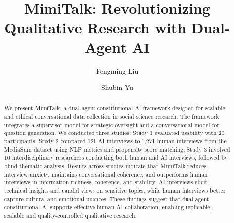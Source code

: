 \documentclass[sigchi,nonacm,manuscript]{acmart}
\begin{document}
\title{MimiTalk: Revolutionizing Qualitative Research with Dual-Agent AI}

\author{Fengming Liu}

\author{Shubin Yu}



\renewcommand{\shortauthors}{Liu and Yu}

\begin{abstract}
We present MimiTalk, a dual-agent constitutional AI framework designed for scalable and ethical conversational data collection in social science research. The framework integrates a supervisor model for strategic oversight and a conversational model for question generation. We conducted three studies: Study 1 evaluated usability with 20 participants; Study 2 compared 121 AI interviews to 1,271 human interviews from the MediaSum dataset \citep{zhuMediaSumLargescaleMedia2021} using NLP metrics and propensity score matching; Study 3 involved 10 interdisciplinary researchers conducting both human and AI interviews, followed by blind thematic analysis. Results across studies indicate that MimiTalk reduces interview anxiety, maintains conversational coherence, and outperforms human interviews in information richness, coherence, and stability. AI interviews elicit technical insights and candid views on sensitive topics, while human interviews better capture cultural and emotional nuances. These findings suggest that dual-agent constitutional AI supports effective human-AI collaboration, enabling replicable, scalable and quality-controlled qualitative research.
\end{abstract}
\end{document}
